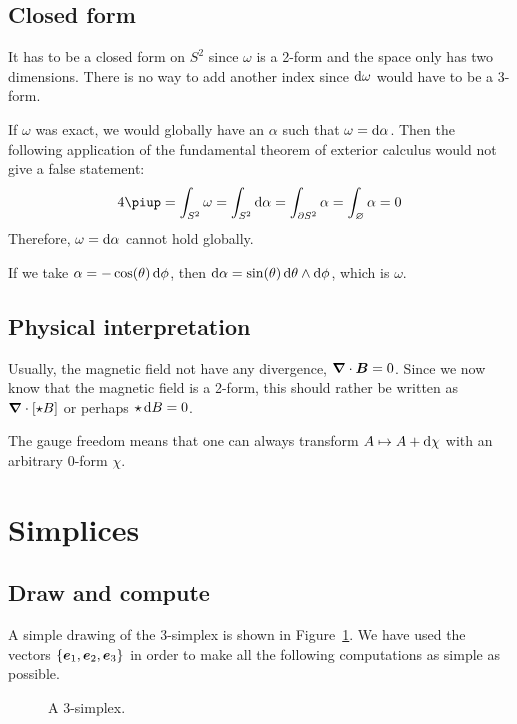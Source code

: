 \documentclass[11pt, english, fleqn, DIV=15, headinclude, BCOR=1cm]{scrartcl}
\begin{document}
\subsection{Closed form}

It has to be a closed form on $S^2$ since $\omega$ is a 2-form and the space
only has two dimensions. There is no way to add another index since $\mathop{}\!\mathrm d
\omega$ would have to be a 3-form.

If $\omega$ was exact, we would globally have an $\alpha$ such that $\omega =
\mathop{}\!\mathrm d\alpha$. Then the following application of the fundamental theorem of
exterior calculus would not give a false statement:
\[
    4 \piup = \int_{S^2} \omega = \int_{S^2} \dif \alpha = \int_{\partial S^2}
    \alpha = \int_\varnothing \alpha = 0
\]
Therefore, $\omega = \mathop{}\!\mathrm d\alpha$ cannot hold globally.

If we take $\alpha = - \cos(\theta) \mathop{}\!\mathrm d \phi$, then $\mathop{}\!\mathrm d \alpha =
\sin(\theta) \mathop{}\!\mathrm d \theta \wedge \mathop{}\!\mathrm d \phi$, which is $\omega$.

\subsection{Physical interpretation}

Usually, the magnetic field not have any divergence, $\boldsymbol{\nabla} \cdot \boldsymbol{B} =
0$. Since we now know that the magnetic field is a 2-form, this should rather
be written as $\boldsymbol{\nabla} \cdot [\star B]$ or perhaps $\star \mathop{}\!\mathrm d B = 0$.

The gauge freedom means that one can always transform $A \mapsto A + \mathop{}\!\mathrm d \chi$
with an arbitrary 0-form $\chi$.

\section{Simplices}
\label{homework:3}

\subsection{Draw and compute}

A simple drawing of the 3-simplex is shown in Figure~\ref{fig:3-simplex}. We
have used the vectors $\{ \boldsymbol{e}_1, \boldsymbol{e}_2, \boldsymbol{e}_3 \}$ in order to make all the
following computations as simple as possible.

\begin{figure}[htbp]
    \centering
    \caption{%
        A 3-simplex.
    }
    \label{fig:3-simplex}
\end{figure}
\end{document}
